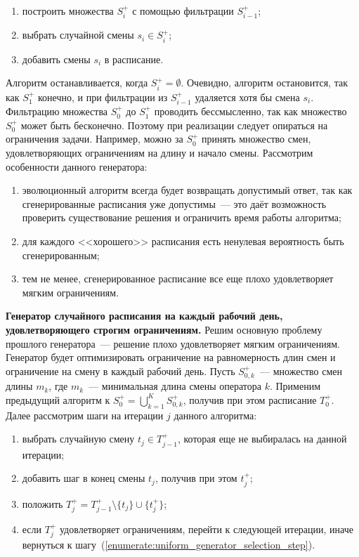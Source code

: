 \documentclass[times,specification,annotation]{itmo-student-thesis}
\begin{document}
\begin{enumerate}
    \item построить множества $S^+_i$ с помощью фильтрации $S^+_{i - 1}$;
    \item выбрать случайной смены $s_i \in S^+_i$;
    \item добавить смены $s_i$ в расписание.
\end{enumerate}

Алгоритм останавливается, когда $S^+_i = \emptyset$.
Очевидно, алгоритм остановится, так как $S^+_1$ конечно, и при фильтрации из $S^+_{i - 1}$ удаляется хотя бы смена $s_i$.
Фильтрацию множества $S^+_0$ до $S^+_1$ проводить бессмысленно, так как множество $S^+_0$ может быть бесконечно.
Поэтому при реализации следует опираться на ограничения задачи.
Например, можно за $S^+_0$ принять множество смен, удовлетворяющих ограничениям на длину и начало смены.
Рассмотрим особенности данного генератора:

\begin{enumerate}
    \item эволюционный алгоритм всегда будет возвращать допустимый ответ, так как сгенерированные расписания уже допустимы~--- это даёт возможность проверить существование решения и ограничить время работы алгоритма;
    \item для каждого <<хорошего>> расписания есть ненулевая вероятность быть сгенерированным;
    \item тем не менее, сгенерированное расписание все еще плохо удовлетворяет мягким ограничениям.
\end{enumerate}

\textbf{Генератор случайного расписания на каждый рабочий день, удовлетворяющего строгим ограничениям.}
Решим основную проблему прошлого генератора~--- решение плохо удовлетворяет мягким ограничениям.
Генератор будет оптимизировать ограничение на равномерность длин смен и ограничение на смену в каждый рабочий день.
Пусть $S^+_{0, k}$~--- множество смен длины $m_k$, где $m_k$~--- минимальная длина смены оператора $k$.
Применим предыдущий алгоритм к $S^+_0 = \bigcup\limits_{k = 1}^{K} S^+_{0, k}$, получив при этом расписание $T^+_0$.
Далее рассмотрим шаги на итерации $j$ данного алгоритма:

\begin{enumerate}
    \item \label{enumerate:uniform_generator_selection_step} выбрать случайную смену $t_j \in T^+_{j - 1}$, которая еще не выбиралась на данной итерации;
    \item добавить шаг в конец смены $t_j$, получив при этом $t^+_j$;
    \item положить $T^+_j = T^+_{j - 1} \setminus \{ t_j \} \cup \{ t^+_j \}$;
    \item если $T^+_j$ удовлетворяет ограничениям, перейти к следующей итерации, иначе вернуться к шагу~(\ref{enumerate:uniform_generator_selection_step}).
\end{enumerate}
\end{document}
